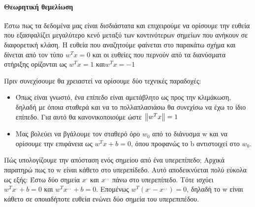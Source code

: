 \begin{figure}
	\centering
	\caption[Χώρος χαρακτηριστικών προβλήματος ταξινόμησης όγκων ως προς κακοήθεια]{}	
\end{figure}

\paragraph{Θεωρητική θεμελίωση} Έστω πως τα δεδομένα μας είναι δισδιάστατα και επιχειρούμε να ορίσουμε την ευθεία που εξασφαλίζει μεγαλύτερο κενό μεταξύ των κοντινότερων σημείων που ανήκουν σε διαφορετική κλάση. Η ευθεία που αναζητούμε φαίνεται στο παρακάτω σχήμα και δίνεται από τον τύπο $w^T x = 0$ και οι ευθείες που περνούν από τα διανύσματα στήριξης ορίζονται ως $w^T x = 1$ και$ w^T x =-1$

Πριν συνεχίσουμε θα χρειαστεί να ορίσουμε δύο τεχνικές παραδοχές:
\begin{itemize}
	\item Όπως είναι γνωστό, ένα επίπεδο είναι αμετάβλητο ως προς την κλιμάκωση, δηλαδή με όποια σταθερά και να το πολλαπλασιάσω θα συνεχίσω να έχω το ίδιο επίπεδο. Για αυτό θα κανονικοποιούμε ώστε $\left\lVert w^T x\right\rVert=1$
	\item  Μας βολεύει να βγάλουμε τον σταθερό όρο $w_0$ από το διάνυσμα w και να ορίσουμε την επιφάνεια ως $w^T  x + b = 0$, όπου προφανώς το b αντιστοιχεί στο $w_0$.	
\end{itemize}

Πώς υπολογίζουμε την απόσταση ενός σημείου από ένα υπερεπίπεδο;
Αρχικά παρατηρώ πως το w είναι κάθετο στο υπερεπίδεδο. Αυτό αποδεικνύεται πολύ εύκολα ως εξής: Έστω δύο σημεία $x^,$ και $x^{,,}$ πάνω στο υπερεπίπεδο. Τότε ισχύει $w^T  x^, + b = 0$ και $w^T  x^{,,} + b = 0$. Επομένως $w^T (x^, -  x^{,,}) = 0$, δηλαδή το w είναι κάθετο σε οποιαδήποτε ευθεία ενώνει δύο σημεία του υπερεπιπέδου.

